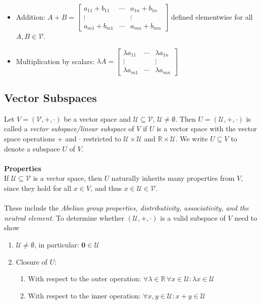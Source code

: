 \documentclass{report}
\begin{document}
\begin{itemize}
\item Addition: $A+B=\begin{bmatrix}
a_{11}+b_{11}&\cdots&a_{1n}+b_{1n}\\
\vdots&&\vdots\\
a_{m1}+b_{m1}&\cdots&a_{mn}+b_{mn}
\end{bmatrix}$ defined elementwise for all $A,B\in\mathcal{V}$.
\item Multiplication by scalars: 
$\lambda A=\begin{bmatrix}
\lambda a_{11}&\cdots&\lambda a_{1n}\\
\vdots&&\vdots\\
\lambda a_{m1}&\cdots&\lambda a_{mn}
\end{bmatrix}$ 
\end{itemize}
\newpage

\subsection{Vector Subspaces}
Let $V=(\mathcal{V,+,\cdot})$ be a vector space and $\mathcal{U\subseteq V,\,U\neq\emptyset}$. 
Then $U=(\mathcal{U},+,\cdot)$ is called a \textit{vector subspace/linear subspace} of $V$ if $U$ 
is a vector space with the vector space operations + and $\cdot$ restricted to 
$\mathcal{U\times U}$ and $\mathbb{R}\times\mathcal{U}$. We write $U\subseteq V$ to denote a subspace $U$ of $V$.\\
\vspace{1mm}\\
\textbf{Properties}\\
If $\mathcal{U\subseteq V}$ is a vector space, then $U$ naturally inherits many properties from $V$, since
they hold for all $x\in V$, and thus 
$x\in\mathcal{U\in V}$.\\
\vspace{1mm}\\
These include the \textit{Abelian group properties, distributivity, associativity, and the neutral element}.
To determine whether $(\mathcal{U},+,\cdot)$ is a valid subspace of $V$ need to show
\begin{enumerate}
\item$\mathcal{U}\neq\emptyset$, in particular: $\mathbf{0}\in\mathcal{U}$
\item Closure of $U$:
\begin{enumerate}
\item With respect to the outer operation: 
$\forall\lambda\in\mathbb{R}\,\forall x\in\mathcal{U}:\lambda x\in\mathcal{U}$
\item With respect to the inner operation:
$\forall x,y\in\mathcal{U}:x+y\in\mathcal{U}$
\end{enumerate}
\end{enumerate}
\newpage
\end{document}

